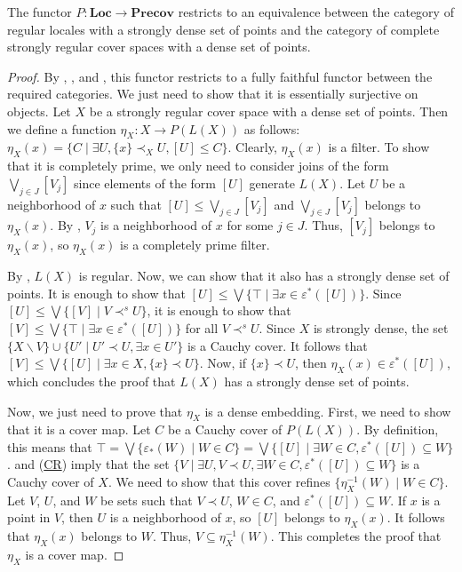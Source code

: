 \documentclass[reqno]{amsart}
\newcommand{\axref}[1]{(\hyperref[ax:#1]{#1})}
\theoremstyle{definition}
\theoremstyle{remark}
\numberwithin{figure}{section}
\newcommand{\rb}{\prec}
\newcommand{\cat}[1]{\mathbf{#1}}
\begin{document}
\begin{thm}
The functor $P : \cat{Loc} \to \cat{Precov}$ restricts to an equivalence between the category of regular locales with a strongly dense set of points and the category of complete strongly regular cover spaces with a dense set of points.
\end{thm}
\begin{proof}
By , , and , this functor restricts to a fully faithful functor between the required categories.
We just need to show that it is essentially surjective on objects.
Let $X$ be a strongly regular cover space with a dense set of points.
Then we define a function $\eta_X : X \to P(L(X))$ as follows: $\eta_X(x) = \{ C \mid \exists U, \{ x \} \rb_X U, [U] \leq C \}$.
Clearly, $\eta_X(x)$ is a filter.
To show that it is completely prime, we only need to consider joins of the form $\bigvee_{j \in J} [V_j]$ since elements of the form $[U]$ generate $L(X)$.
Let $U$ be a neighborhood of $x$ such that $[U] \leq \bigvee_{j \in J} [V_j]$ and $\bigvee_{j \in J} [V_j]$ belongs to $\eta_X(x)$.
By , $V_j$ is a neighborhood of $x$ for some $j \in J$.
Thus, $[V_j]$ belongs to $\eta_X(x)$, so $\eta_X(x)$ is a completely prime filter.

By , $L(X)$ is regular.
Now, we can show that it also has a strongly dense set of points.
It is enough to show that $[U] \leq \bigvee \{ \top \mid \exists x \in \varepsilon^*([U]) \}$.
Since $[U] \leq \bigvee \{ [V] \mid V \rb^s U \}$, it is enough to show that $[V] \leq \bigvee \{ \top \mid \exists x \in \varepsilon^*([U]) \}$ for all $V \rb^s U$.
Since $X$ is strongly dense, the set $\{ X \backslash V \} \cup \{ U' \mid U' \rb U, \exists x \in U' \}$ is a Cauchy cover.
It follows that $[V] \leq \bigvee \{ [U] \mid \exists x \in X, \{ x \} \rb U \}$.
Now, if $\{ x \} \rb U$, then $\eta_X(x) \in \varepsilon^*([U])$, which concludes the proof that $L(X)$ has a strongly dense set of points.

Now, we just need to prove that $\eta_X$ is a dense embedding.
First, we need to show that it is a cover map.
Let $C$ be a Cauchy cover of $P(L(X))$.
By definition, this means that $\top = \bigvee \{ \varepsilon_*(W) \mid W \in C \} = \bigvee \{ [U] \mid \exists W \in C, \varepsilon^*([U]) \subseteq W \}$.
 and \axref{CR} imply that the set $\{ V \mid \exists U, V \rb U, \exists W \in C, \varepsilon^*([U]) \subseteq W \}$ is a Cauchy cover of $X$.
We need to show that this cover refines $\{ \eta_X^{-1}(W) \mid W \in C \}$.
Let $V$, $U$, and $W$ be sets such that $V \rb U$, $W \in C$, and $\varepsilon^*([U]) \subseteq W$.
If $x$ is a point in $V$, then $U$ is a neighborhood of $x$, so $[U]$ belongs to $\eta_X(x)$.
It follows that $\eta_X(x)$ belongs to $W$.
Thus, $V \subseteq \eta_X^{-1}(W)$.
This completes the proof that $\eta_X$ is a cover map.


\end{proof}
\end{document}
